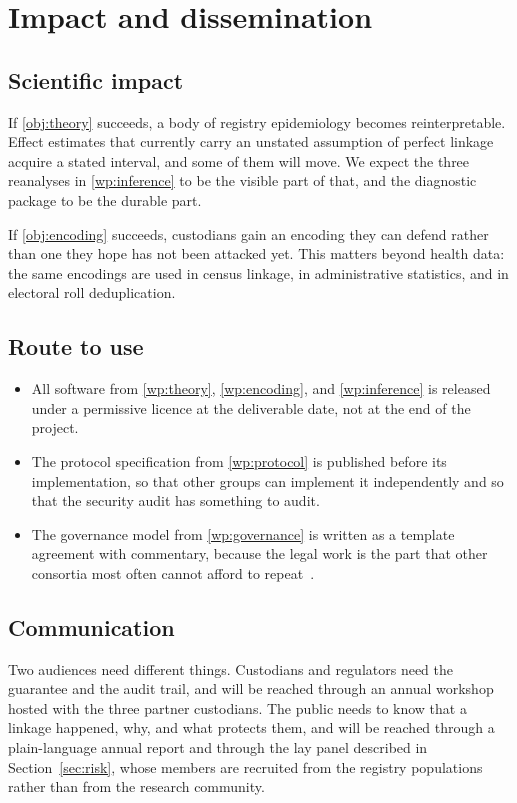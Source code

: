 \section{Impact and dissemination}
\label{sec:impact}

\subsection{Scientific impact}

If \ref{obj:theory} succeeds, a body of registry epidemiology becomes reinterpretable. Effect
estimates that currently carry an unstated assumption of perfect linkage acquire a stated interval,
and some of them will move. We expect the three reanalyses in \ref{wp:inference} to be the visible
part of that, and the diagnostic package to be the durable part.

If \ref{obj:encoding} succeeds, custodians gain an encoding they can defend rather than one they
hope has not been attacked yet. This matters beyond health data: the same encodings are used in
census linkage, in administrative statistics, and in electoral roll deduplication.

\subsection{Route to use}

\begin{itemize}
  \item All software from \ref{wp:theory}, \ref{wp:encoding}, and \ref{wp:inference} is released
    under a permissive licence at the deliverable date, not at the end of the project.
  \item The protocol specification from \ref{wp:protocol} is published before its implementation,
    so that other groups can implement it independently and so that the security audit has
    something to audit.
  \item The governance model from \ref{wp:governance} is written as a template agreement with
    commentary, because the legal work is the part that other consortia most often cannot afford
    to repeat~\cite{vestergaardnnamdi2023governance}.
\end{itemize}

\subsection{Communication}

Two audiences need different things. Custodians and regulators need the guarantee and the audit
trail, and will be reached through an annual workshop hosted with the three partner custodians.
The public needs to know that a linkage happened, why, and what protects them, and will be reached
through a plain-language annual report and through the lay panel described in Section~\ref{sec:risk},
whose members are recruited from the registry populations rather than from the research community.

